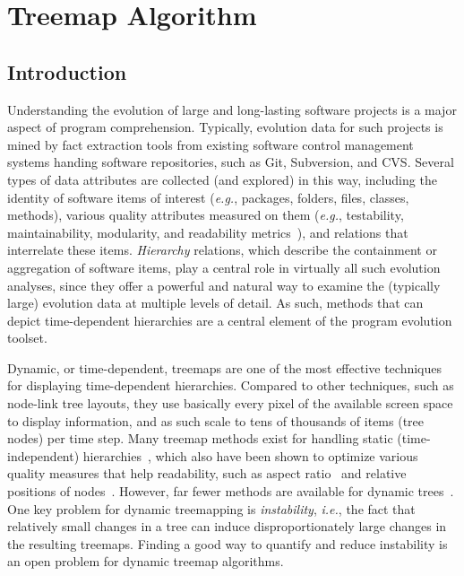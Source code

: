 \chapter{Treemap Algorithm}


\section{Introduction} \label{sec:intro}
%
%
Understanding the evolution of large and long-lasting software projects is a major aspect of program comprehension. Typically, evolution data for such projects is mined by fact extraction tools from existing software control management systems handing software repositories, such as Git\cite{git}, Subversion\cite{subversion}, and CVS\cite{cvs}.
Several types of data attributes are collected (and explored) in this way, including the identity of software items of interest (\emph{e.g.}, packages, folders, files, classes, methods), various quality attributes measured on them (\emph{e.g.}, testability, maintainability, modularity, and readability metrics~\cite{lanza06}), and relations that interrelate these items. \emph{Hierarchy} relations, which describe the containment or aggregation of software items, play a central role in virtually all such evolution analyses, since they offer a powerful and natural way to examine the (typically large) evolution data at multiple levels of detail. As such, methods that can depict time-dependent hierarchies are a central element of the program evolution toolset.

Dynamic, or time-dependent, treemaps are one of the most effective techniques for displaying time-dependent hierarchies. Compared to other techniques, such as node-link tree layouts, they use basically every pixel of the available screen space to display information, and as such scale to tens of thousands of items (tree nodes) per time step. Many treemap methods exist for handling static (time-independent) hierarchies~\cite{shneiderman92,sqr}, which also have been shown to optimize various quality measures that help readability, such as aspect ratio~\cite{sqr, nagamochi07} and relative positions of nodes~\cite{sot,ordered,Ghoniem2015, Buchin2011,nmap}. However, far fewer methods are available for dynamic trees~\cite{hahn10,sondag17,htm}. One key problem for dynamic treemapping is \emph{instability}, \emph{i.e.}, the fact that relatively small changes in a tree can induce disproportionately large changes in the resulting treemaps. Finding a good way to quantify and reduce instability is an open problem for dynamic treemap algorithms.

